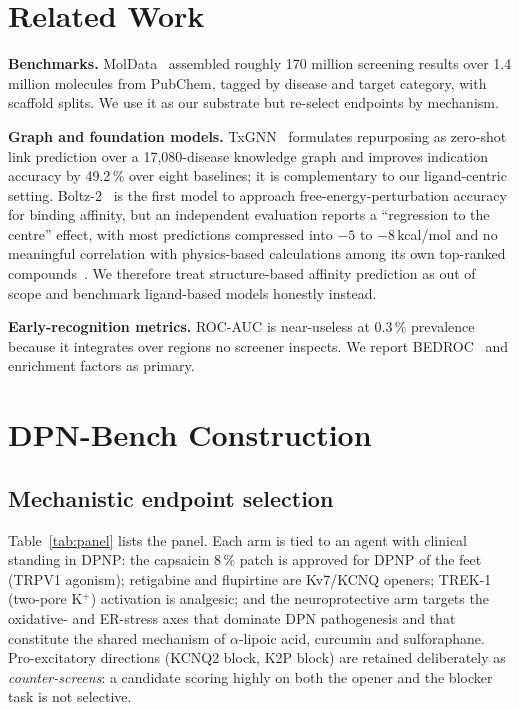 \documentclass[conference]{IEEEtran}
\begin{document}
\section{Related Work}

\textbf{Benchmarks.} MolData~\cite{moldata} assembled roughly 170 million
screening results over 1.4 million molecules from PubChem, tagged by disease and
target category, with scaffold splits. We use it as our substrate but re-select
endpoints by mechanism.

\textbf{Graph and foundation models.} TxGNN~\cite{txgnn} formulates repurposing
as zero-shot link prediction over a 17{,}080-disease knowledge graph and improves
indication accuracy by 49.2\,\% over eight baselines; it is complementary to our
ligand-centric setting. Boltz-2~\cite{boltz2} is the first model to approach
free-energy-perturbation accuracy for binding affinity, but an independent
evaluation reports a ``regression to the centre'' effect, with most predictions
compressed into $-5$ to $-8$\,kcal/mol and no meaningful correlation with
physics-based calculations among its own top-ranked
compounds~\cite{boltzreliability}. We therefore treat structure-based affinity
prediction as out of scope and benchmark ligand-based models honestly instead.

\textbf{Early-recognition metrics.} ROC-AUC is near-useless at 0.3\,\%
prevalence because it integrates over regions no screener inspects. We report
BEDROC~\cite{bedroc} and enrichment factors as primary.

\section{DPN-Bench Construction}

\subsection{Mechanistic endpoint selection}
Table~\ref{tab:panel} lists the panel. Each arm is tied to an agent with
clinical standing in DPNP: the capsaicin 8\,\% patch is approved for DPNP of the
feet (TRPV1 agonism); retigabine and flupirtine are Kv7/KCNQ openers; TREK-1
(two-pore K$^+$) activation is analgesic; and the neuroprotective arm targets the
oxidative- and ER-stress axes that dominate DPN pathogenesis and that constitute
the shared mechanism of $\alpha$-lipoic acid, curcumin and sulforaphane.
Pro-excitatory directions (KCNQ2 block, K2P block) are retained deliberately as
\emph{counter-screens}: a candidate scoring highly on both the opener and the
blocker task is not selective.
\end{document}
